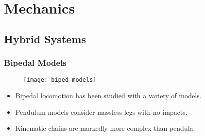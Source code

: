 \section{Mechanics}
\showtoc

\subsection{Hybrid Systems}
\begin{frame}
  \frametitle{Bipedal Models}
  \begin{figure}
    \centering
    \texttt{[image: biped-models]}
  \end{figure}
  \begin{itemize}
  \item Bipedal locomotion has been studied with a variety of models.
  \item Pendulum models consider massless legs with no impacts.
  \item Kinematic chains are markedly more complex than pendula.
  \end{itemize}
\end{frame}


